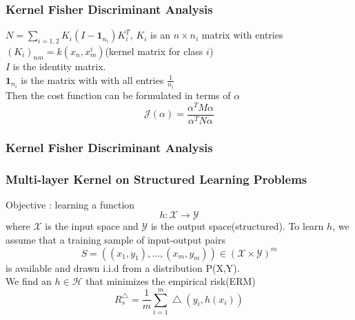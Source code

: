 \documentclass[a4paper,compress,svgnames]{beamer}
\begin{document}
\begin{frame}
\frametitle{Kernel Fisher Discriminant Analysis}
$N = \sum_{i=1,2} K_i(I - \bm{1}_{n_i})K_i^T $, $K_i$ is an $n \times n_i$ matrix with entries $(K_i)_{nm} = k(x_n, x_m^i)$(kernel matrix for class $i$) \\
$I$ is the identity matrix.\\
$\bm{1}_{n_i}$ is the matrix with with all entries $\frac{1}{n_i}$\\
\vspace{0.2in}
Then the cost function can be formulated in terms of $\alpha$
\[ \mathcal{J}(\alpha) = \frac{\alpha^T M \alpha}{\alpha^T N \alpha}  \]
\end{frame}

\begin{frame}
\frametitle{Kernel Fisher Discriminant Analysis}
\renewcommand{\arraystretch}{2.1}
\begin{table}
\centering
{}
\caption{Experimental Results of KFDA with multi-layer kernels.}
\end{table}
\renewcommand{\arraystretch}{1}
\end{frame}

\begin{frame}
\frametitle{Multi-layer Kernel on Structured Learning Problems}
Objective : learning a function
\[ h: \mathcal{X} \longrightarrow \mathcal{Y} \]
where $\mathcal{X}$ is the input space and $\mathcal{Y}$ is the output space(structured). To learn $h$, we assume that a training sample of input-output pairs
\[ S = ((x_1, y_1), \ldots, (x_m, y_m)) \in (\mathcal{X} \times \mathcal{Y})^m \]
is available and drawn i.i.d from a distribution P(X,Y).\\
\vspace{0.2in}
We find an $h \in \mathcal{H}$ that minimizes the empirical risk(ERM)
\[ R_s^{\bigtriangleup} = \frac{1}{m} \sum_{i=1}^m \bigtriangleup(y_i, h(x_i)) \]
\end{frame}
\end{document}
